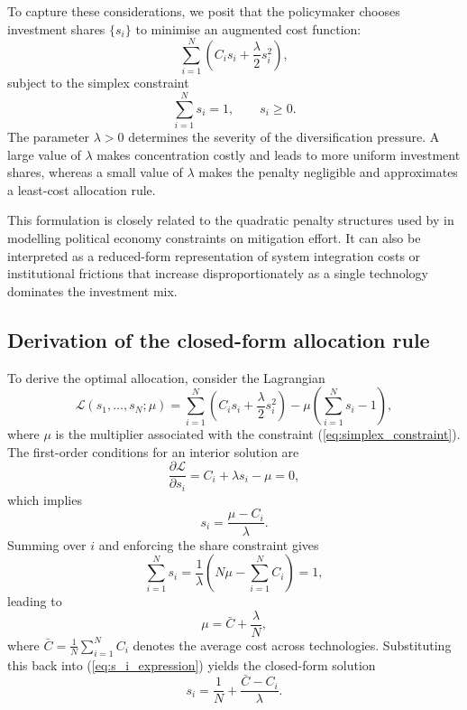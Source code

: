 \documentclass[preprint,authoryear,12pt]{elsarticle}
\begin{document}
To capture these considerations, we posit that the policymaker chooses investment shares
$\{s_i\}$ to minimise an augmented cost function:
\begin{equation}
    \sum_{i=1}^{N} \left( C_i s_i + \frac{\lambda}{2} s_i^2 \right),
    \label{eq:velocity_objective}
\end{equation}
subject to the simplex constraint
\begin{equation}
    \sum_{i=1}^{N} s_i = 1, \qquad s_i \ge 0.
    \label{eq:simplex_constraint}
\end{equation}
The parameter $\lambda > 0$ determines the severity of the diversification pressure. A large
value of $\lambda$ makes concentration costly and leads to more uniform investment shares,
whereas a small value of $\lambda$ makes the penalty negligible and approximates a least-cost
allocation rule.

This formulation is closely related to the quadratic penalty structures used by
\cite{BauerHallegatteMcIsaac2025} in modelling political economy constraints on mitigation
effort. It can also be interpreted as a reduced-form representation of system integration costs or
institutional frictions that increase disproportionately as a single technology dominates the
investment mix.

\subsection{Derivation of the closed-form allocation rule}

To derive the optimal allocation, consider the Lagrangian
\begin{equation}
    \mathcal{L}(s_1,\ldots,s_N;\mu)
    = \sum_{i=1}^{N} \left( C_i s_i + \frac{\lambda}{2} s_i^2 \right)
    - \mu \left( \sum_{i=1}^{N} s_i - 1 \right),
\end{equation}
where $\mu$ is the multiplier associated with the constraint
(\ref{eq:simplex_constraint}). The first-order conditions for an interior solution are
\begin{equation}
    \frac{\partial \mathcal{L}}{\partial s_i} = C_i + \lambda s_i - \mu = 0,
\end{equation}
which implies
\begin{equation}
    s_i = \frac{\mu - C_i}{\lambda}.
    \label{eq:s_i_expression}
\end{equation}
Summing over $i$ and enforcing the share constraint gives
\begin{equation}
    \sum_{i=1}^{N} s_i 
    = \frac{1}{\lambda}\left( N \mu - \sum_{i=1}^{N} C_i \right) = 1,
\end{equation}
leading to
\begin{equation}
    \mu = \bar{C} + \frac{\lambda}{N}, 
\end{equation}
where $\bar{C} = \frac{1}{N} \sum_{i=1}^{N} C_i$ denotes the average cost across technologies.
Substituting this back into (\ref{eq:s_i_expression}) yields the closed-form solution
\begin{equation}
    s_i
    = \frac{1}{N} + \frac{\bar{C} - C_i}{\lambda}.
    \label{eq:closedform_velocity}
\end{equation}
\end{document}

